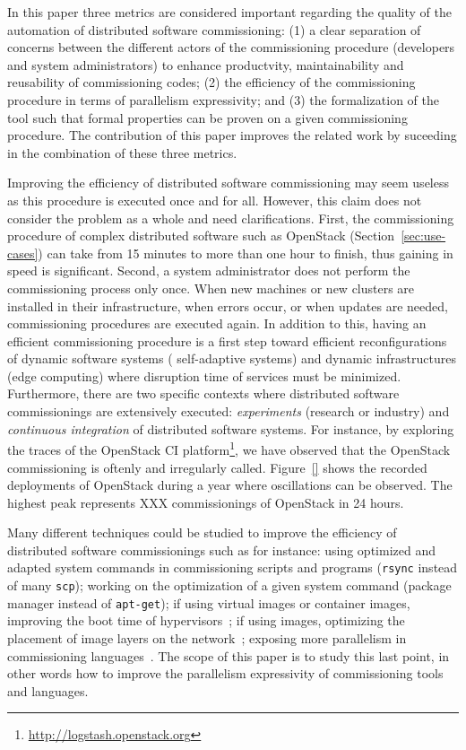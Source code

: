 In this paper three metrics are considered important regarding the
quality of the automation of distributed software commissioning: (1) a
clear separation of concerns between the different actors of the
commissioning procedure (\ie developers and system administrators) to
enhance productvity, maintainability and reusability of commissioning
codes; (2) the efficiency of the commissioning procedure in terms of
parallelism expressivity; and (3) the formalization of the tool such
that formal properties can be proven on a given commissioning
procedure. The contribution of this paper improves the related work by
suceeding in the combination of these three metrics.

Improving the efficiency of distributed software commissioning may
seem useless as this procedure is executed once and for all. However,
this claim does not consider the problem as a whole and need
clarifications.
%
First, the commissioning procedure of complex distributed software
such as OpenStack (Section~\ref{sec:use-cases}) can take from 15
minutes to more than one hour to finish, thus gaining in speed is
significant. Second, a system administrator does not perform the
commissioning process only once. When new machines or new clusters are
installed in their infrastructure, when errors occur, or when updates
are needed, commissioning procedures are executed again. In addition
to this, having an efficient commissioning procedure is a first step
toward efficient reconfigurations of dynamic software systems (\eg
self-adaptive systems) and dynamic infrastructures (\eg edge
computing) where disruption time of services must be minimized.
Furthermore, there are two specific contexts where distributed
software commissionings are extensively executed: \emph{experiments}
(research or industry) and \emph{continuous integration} of
distributed software systems. For instance, by exploring the traces of
the OpenStack CI
platform\footnote{\url{http://logstash.openstack.org}}, we have
observed that the OpenStack commissioning is oftenly and irregularly
called. Figure~\ref{} shows the recorded deployments of OpenStack
during a year where oscillations can be observed. The highest peak
represents XXX commissionings of OpenStack in 24 hours.
%

Many different techniques could be studied to improve the efficiency
of distributed software commissionings such as for instance: using
optimized and adapted system commands in commissioning scripts and
programs (\eg \texttt{rsync} instead of many \texttt{scp}); working on
the optimization of a given system command (\eg \nix package manager
instead of \texttt{apt-get}); if using virtual images or container
images, improving the boot time of
hypervisors~\cite{nguyen:hal-02172288}; if using \docker images,
optimizing the placement of image layers on the
network~\cite{darrous:hal-01745405}; exposing more parallelism in
commissioning languages~\cite{dicosmo:hal-01233489}. The scope of this
paper is to study this last point, in other words how to improve the
parallelism expressivity of commissioning tools and languages.

